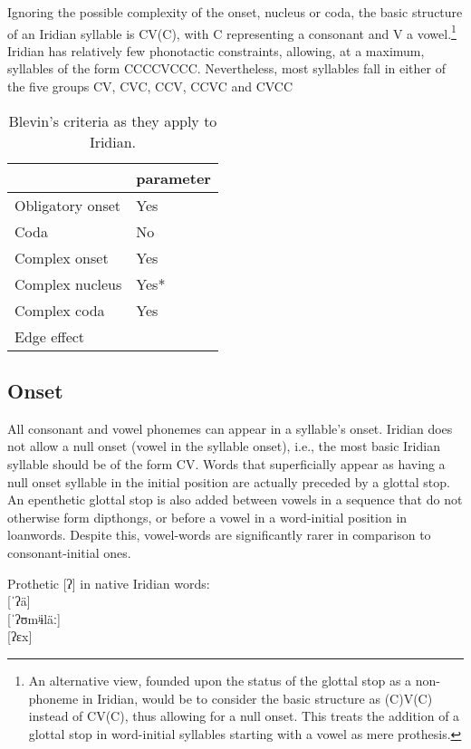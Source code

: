 Ignoring the possible complexity of the onset, nucleus or coda, the basic
structure of an Iridian syllable is CV(C), with C representing a consonant and V
a vowel.\footnote{An alternative view, founded upon the status of the glottal
stop as a non-phoneme in Iridian, would be to consider the basic structure as
(C)V(C) instead of CV(C), thus allowing for a null onset. This treats the
addition of a glottal stop in word-initial syllables starting with a vowel as
mere prothesis.} Iridian has relatively few phonotactic constraints, allowing,
at a maximum, syllables of the form CCCCVCCC. Nevertheless, most syllables fall
in either of the five groups CV, CVC, CCV, CCVC and CVCC

\begin{table}[h!]
	\small
	\caption{Blevin's criteria as they apply to Iridian.}
	\medskip
	\begin{tabularx}{0.6\textwidth}{@{}YM@{}}
		\toprule
		& {\sc parameter}\\
		\midrule
		Obligatory onset & Yes\\
		Coda & No\\
		Complex onset & Yes\\
		Complex nucleus & Yes*\\
		Complex coda & Yes\\
		Edge effect & \\
		\bottomrule
	\end{tabularx}
\end{table}


\subsection{Onset}

\par All consonant and vowel phonemes can appear in a syllable's onset. Iridian
does not allow a null onset (vowel in the syllable onset), i.e., the most basic
Iridian syllable should be of the form CV. Words that superficially appear as
having a null onset syllable in the initial position are actually preceded by a
glottal stop. An epenthetic glottal stop is also added between vowels in a
sequence that do not otherwise form dipthongs, or before a vowel in a
word-initial position in loanwords. Despite this, vowel-words are significantly
rarer in comparison to consonant-initial ones.

\ex
Prothetic [ʔ] in native Iridian words:\\
 [ˈʔä]\\
 [ˈʔʊmʲɨläː]\\
 [ʔɛx]
\xe

